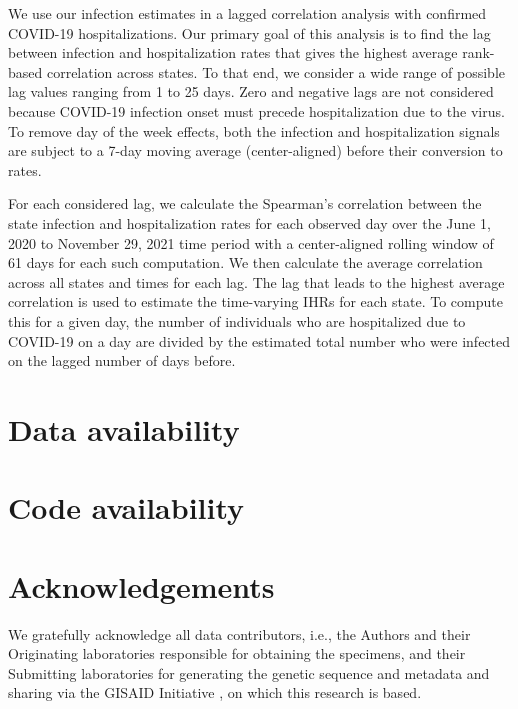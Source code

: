 \documentclass{article}
\begin{document}
We use our infection estimates in a lagged correlation analysis with confirmed
COVID-19 hospitalizations. Our primary goal of this analysis is to find the lag
between infection and hospitalization rates that gives the highest average
rank-based correlation across \US states. To that end, we consider a wide range
of possible lag values ranging from 1 to 25 days. Zero and negative lags are not
considered because COVID-19 infection onset must precede hospitalization due to
the virus. To remove day of the week effects, both the infection and
hospitalization signals are subject to a 7-day moving average (center-aligned)
before their conversion to rates.

For each considered lag, we calculate the Spearman's correlation between the 
state infection and hospitalization rates for each observed day 
over the June 1, 2020 to November 29, 2021
time period %
with a center-aligned rolling window of 61 days for each such computation.
We then calculate the average correlation across all states and times for each lag. 
The lag that leads to the highest average correlation is used to estimate 
the time-varying IHRs for each
state. To compute this for a given day, the number of individuals who are
hospitalized due to COVID-19 on a day are divided by the estimated total number
who were infected on the lagged number of days before.


\section*{Data availability}
\section*{Code availability}

\clearpage





\section*{Acknowledgements}

We gratefully acknowledge all data contributors, i.e., the Authors and their
Originating laboratories responsible for obtaining the specimens, and their
Submitting laboratories for generating the genetic sequence and metadata and
sharing via the GISAID Initiative \citep{elbe2017data}, on which this research
is based.
\end{document}
